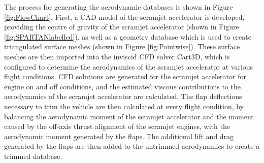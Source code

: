 The process for generating the aerodynamic databases is shown in Figure \ref{fig:FlowChart}. First, a CAD model of the scramjet accelerator is developed, providing the centre of gravity of the scramjet accelerator (shown in Figure \ref{fig:SPARTANlabelled}), as well as a geometry database which is used to create triangulated surface meshes (shown in Figure \ref{fig:Pointwise}). These surface meshes are then imported into the inviscid CFD solver Cart3D\cite{CART3D}, which is configured to determine the aerodynamics of the scramjet accelerator at various flight conditions. CFD solutions are generated for the scramjet accelerator for engine on and off conditions, and the estimated viscous contributions to the aerodynamics of the scramjet accelerator are calculated.
The flap deflections necessary to trim the vehicle are then calculated at every flight condition, by balancing the aerodynamic moment of the scramjet accelerator and the moment caused by the off-axis thrust alignment of the scramjet engines, with the aerodynamic moment generated by the flaps. 
The additional lift and drag generated by the flaps are then added to the untrimmed aerodynamics to create a trimmed database.








